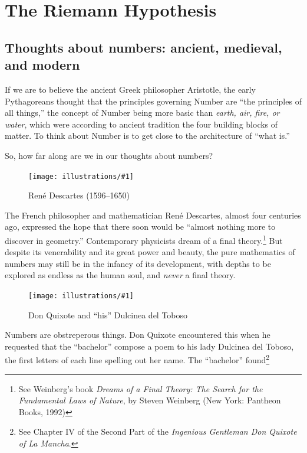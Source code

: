 \documentclass[openany]{book}
\newcommand{\ill}[3]{%
   \begin{figure}[H]%
   \vspace{-2ex}
   \centering%
   \texttt{[image: illustrations/\#1]}%
   \caption{#3}%
   \vspace{-2ex}
    \end{figure}}
\theoremstyle{plain}
\theoremstyle{definition}
\newcommand{\RH}{Riemann Hypothesis\index{Riemann Hypothesis}}
\begin{document}
\part{The \RH{}\label{part1}}


\chapter[Thoughts about numbers]{Thoughts about numbers: ancient, medieval, and modern}

If we are to believe the ancient Greek philosopher Aristotle, the early
Pythagoreans thought that the principles governing Number are ``the
principles of all things,'' the concept of Number being more basic than
{\em earth, air, fire, or water}, which were according to ancient tradition
the four building blocks of matter. To think about Number is to get
close to the architecture of ``what is.''

So, how far along are we in our thoughts about numbers?




\ill{descartes}{.35}{Ren\'e Descartes (1596--1650)}

The French philosopher and mathematician Ren\'e Descartes, almost four
centuries ago, expressed the hope that there soon would be ``almost
nothing more to discover in geometry.'' Contemporary physicists dream
of a final theory.\footnote{See Weinberg's book {\em Dreams of a
    Final Theory: The Search for the Fundamental Laws of Nature}, by
  Steven Weinberg (New York: Pantheon Books, 1992)}  But despite its
venerability and its great power and beauty, the pure mathematics of
numbers may still be in the infancy of its development, with depths to
be explored as endless as the human soul, and {\it never} a final theory.



\ill{quixote}{.5}{Don Quixote and ``his'' Dulcinea del Toboso}

Numbers are obstreperous things. Don Quixote encountered this when he
requested that the ``bachelor'' compose a poem to his lady Dulcinea del
Toboso, the first letters of each line spelling out her name. The
``bachelor'' found\footnote{See Chapter IV of the Second Part of the {\em Ingenious Gentleman Don Quixote of La Mancha}.}
\end{document}
